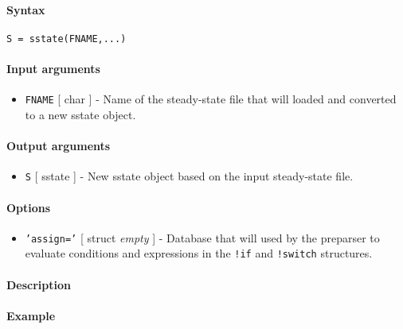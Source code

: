 


	\paragraph{Syntax}\label{syntax}

\begin{verbatim}
S = sstate(FNAME,...)
\end{verbatim}

\paragraph{Input arguments}\label{input-arguments}

\begin{itemize}
\itemsep1pt\parskip0pt
\item
  \texttt{FNAME} {[} char {]} - Name of the steady-state file that will
  loaded and converted to a new sstate object.
\end{itemize}

\paragraph{Output arguments}\label{output-arguments}

\begin{itemize}
\itemsep1pt\parskip0pt
\item
  \texttt{S} {[} sstate {]} - New sstate object based on the input
  steady-state file.
\end{itemize}

\paragraph{Options}\label{options}

\begin{itemize}
\itemsep1pt\parskip0pt
\item
  \texttt{'assign='} {[} struct \textbar{} \emph{empty} {]} - Database
  that will used by the preparser to evaluate conditions and expressions
  in the \texttt{!if} and \texttt{!switch} structures.
\end{itemize}

\paragraph{Description}\label{description}

\paragraph{Example}\label{example}



